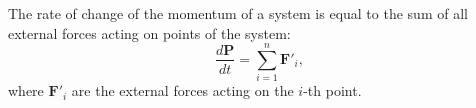 The rate of change of the momentum of a system is equal to the sum of all external forces acting on points of the system:
$$\frac{d\mathbf{P}}{dt} = \sum_{i=1}^{n} \mathbf{F}'_i,$$
where $\mathbf{F}'_i$ are the external forces acting on the $i$-th point.
